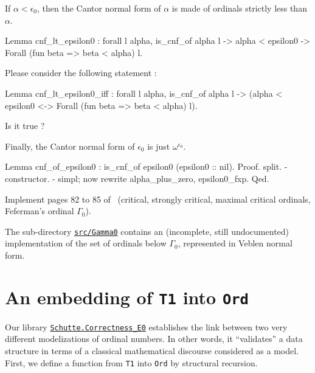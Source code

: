 \documentclass[a4paper]{book}
\begin{document}
{If $\alpha<\epsilon_0$, then the Cantor normal form of $\alpha$ is made of ordinals strictly less than $\alpha$.

\begin{Coqsrc}
Lemma cnf_lt_epsilon0 : 
 forall l alpha, 
   is_cnf_of alpha l ->  alpha < epsilon0 ->
   Forall (fun beta =>  beta < alpha) l.
\end{Coqsrc}


\begin{exercise}
Please consider the following statement :

\begin{Coqsrc}
Lemma cnf_lt_epsilon0_iff : 
 forall l alpha, 
   is_cnf_of alpha l ->  
   (alpha < epsilon0 <->  Forall (fun beta =>  beta < alpha) l).
\end{Coqsrc}

Is it true ?
\end{exercise}

Finally, the Cantor normal form of $\epsilon_0$ is just $\omega^{\epsilon_0}$.

\begin{Coqsrc}
Lemma cnf_of_epsilon0 : is_cnf_of epsilon0 (epsilon0 :: nil).
Proof.
  split.
  - constructor.  
  - simpl;  now rewrite alpha_plus_zero, epsilon0_fxp.
Qed.
\end{Coqsrc}


\begin{project}
Implement pages 82 to 85 of~\cite{schutte} (critical, strongly critical, maximal critical ordinals, Feferman's ordinal $\Gamma_0$).
\end{project}

\begin{remark}
The sub-directory \href{../src/html/hydras.Gamma0.html}%
{\texttt{src/Gamma0}} contains an (incomplete, still undocumented) implementation of the set of ordinals below $\Gamma_0$, represented in Veblen normal form. 
\end{remark}

\section{An embedding of \texttt{T1} into \texttt{Ord}}


Our library 
\href{../src/html/hydras.Schutte.correctness_E0.html}%
{\texttt{Schutte.Correctness\_E0}} establishes the link between two very different modelizations of ordinal numbers. In other words, it ``validates'' a data structure in terms of
a classical mathematical discourse considered as a model. 
First, we define a function from \texttt{T1} into  \texttt{Ord} by structural recursion.

}
\end{document}

